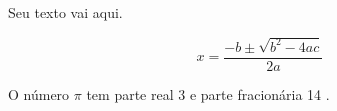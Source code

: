 \documentclass{article}
\def\comando#1=#2.#3{O número #1 tem parte real #2 e parte fracionária #3}
\begin{document}
Seu texto vai aqui.

$$x = \frac{-b\pm \sqrt{b^2-4ac}}{2a}$$

\comando$\pi$=3.14
.
\end{document}
